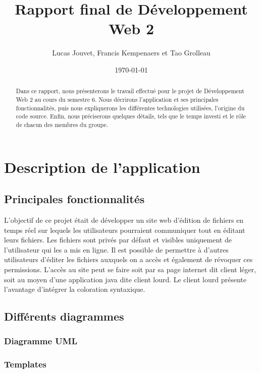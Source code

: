 \documentclass[a4paper, 12pt]{article}
\title{Rapport final de Développement Web 2}
\author{Lucas Jouvet, Francis Kempenaers et Tao Grolleau}
\date{\today}
\begin{document}
\maketitle

\begin{abstract}
  Dans ce rapport, nous présenterons le travail effectué pour le projet de Développement Web 2 au cours du semestre 6. Nous décrirons l'application et ses principales fonctionnalités, puis nous expliquerons les différentes technologies utilisées, l'origine du code source. Enfin, nous préciserons quelques détails, tels que le temps investi et le rôle de chacun des membres du groupe.
\end{abstract}

\newpage

\section{Description de l'application}

\subsection{Principales fonctionnalités}

L'objectif de ce projet était de développer un site web d'édition de fichiers en temps réel sur lequels les utilisateurs pourraient communiquer tout en éditant leurs fichiers. Les fichiers sont privés par défaut et visibles uniquement de l'utilisateur qui les a mis en ligne. Il est possible de permettre à d'autres utilisateurs d'éditer les fichiers auxquels on a accès et également de révoquer ces permissions. L'accès au site peut se faire soit par sa page internet dit client léger, soit au moyen d'une application java dite client lourd. Le client lourd présente l'avantage d'intégrer la coloration syntaxique.

\subsection{Différents diagrammes}

\subsubsection{Diagramme UML}

\subsubsection{Templates}
\end{document}
